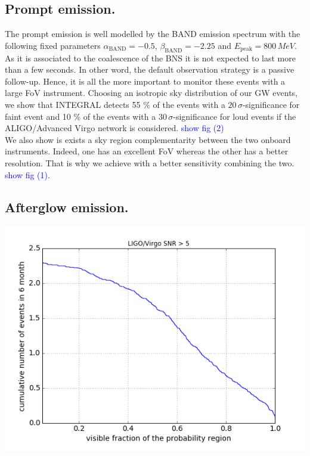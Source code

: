 \documentclass[a0,portrait]{a0poster}
\begin{document}
\begin{multicols}{2}
\subsection*{Prompt emission.}

The prompt emission is well modelled by the BAND emission spectrum with the following fixed parameters $\alpha_{\mathrm{BAND}} = - 0.5$, $\beta_{\mathrm{BAND}} = - 2.25$ and $E_{\mathrm{peak}} = 800 \, MeV$. As it is associated to the coalescence of the BNS it is not expected to last more than a few seconds. In other word, the default observation strategy is a passive follow-up. Hence, it is all the more important to monitor these events with a large FoV instrument. Choosing an isotropic sky distribution of our GW events, we show that INTEGRAL detects 55 \% of the events with a $20 \, \sigma$-significance for faint event and 10 \% of the events with a $30 \, \sigma$-significance for loud events if the ALIGO/Advanced Virgo network is considered. \textcolor{blue}{show fig (2)} \\
\indent We also show is exists a sky region complementarity between the two onboard instruments. Indeed, one has an excellent FoV whereas the other has a better resolution. That is why we achieve with a better sensitivity combining the two. \textcolor{blue}{show fig (1)}.


\subsection*{Afterglow emission.}

\begin{center}\vspace{.5cm}
    \includegraphics[scale=1.4]{figures/covered_region.png}
    \label{covered_region}
\end{center}


\end{multicols}
\end{document}
